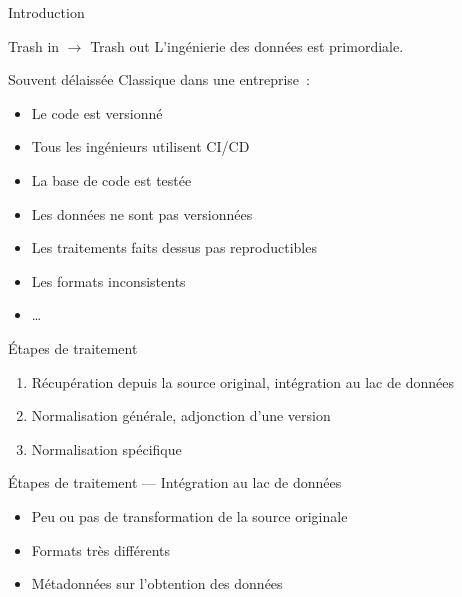 \begin{frame}{Introduction}
  \begin{alertblock}{Trash in $\rightarrow$ Trash out}
    L'ingénierie des données est primordiale.
  \end{alertblock}
\end{frame}

\begin{frame}{Souvent délaissée}
  Classique dans une entreprise~:

  \begin{itemize}[<+->]
    \item Le code est versionné
    \item Tous les ingénieurs utilisent CI/CD
    \item La base de code est testée
  \end{itemize}


  \begin{itemize}[<+->]
    \item Les données ne sont pas versionnées
    \item Les traitements faits dessus pas reproductibles
    \item Les formats inconsistents
    \item …
  \end{itemize}

\end{frame}

\begin{frame}{Étapes de traitement}
  \begin{enumerate}[<+->]
    \item Récupération depuis la source original, intégration au lac de données
    \item Normalisation générale, adjonction d'une version
    \item Normalisation spécifique
  \end{enumerate}  
\end{frame}

\begin{frame}{Étapes de traitement --- Intégration au lac de données}
  \begin{itemize}[<+->]
    \item Peu ou pas de transformation de la source originale
    \item Formats très différents
    \item Métadonnées sur l'obtention des données
  \end{itemize}  
\end{frame}

